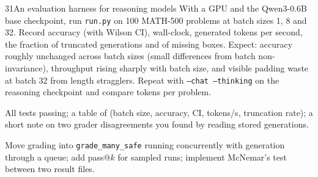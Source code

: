 \begin{labbox}{31}{An evaluation harness for reasoning models}
With a GPU and the Qwen3-0.6B base checkpoint, run \texttt{run.py} on 100 MATH-500 problems at
batch sizes 1, 8 and 32. Record accuracy (with Wilson CI), wall-clock, generated tokens per second,
the fraction of truncated generations and of missing boxes. Expect: accuracy roughly unchanged
across batch sizes (small differences from batch non-invariance), throughput rising sharply with
batch size, and visible padding waste at batch 32 from length stragglers. Repeat with
\texttt{--chat --thinking} on the reasoning checkpoint and compare tokens per problem.

All tests passing; a table of (batch size, accuracy, CI, tokens/s, truncation rate); a short note
on two grader disagreements you found by reading stored generations.

Move grading into \texttt{grade\_many\_safe} running concurrently with generation through a queue;
add pass@$k$ for sampled runs; implement McNemar's test between two result files.
\end{labbox}
